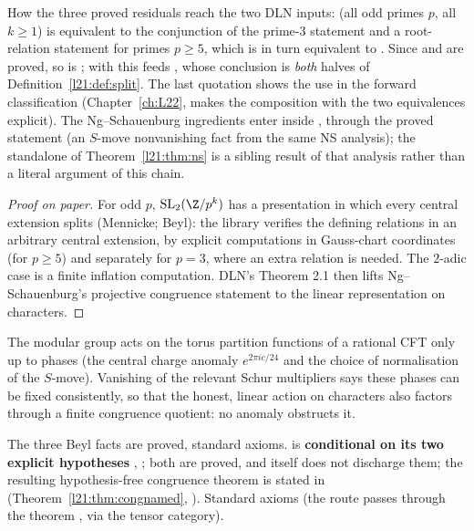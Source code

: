 \begin{dictionary}
How the three proved residuals reach the two DLN inputs:  (all odd primes $p$, all $k\ge1$) is
equivalent to the conjunction of the prime-$3$ statement  and a root-relation statement for primes
$p\ge5$, which is in turn equivalent to . Since  and
 are proved, so is ; with
 this feeds , whose conclusion is \emph{both} halves of
Definition~\ref{l21:def:split}. The last quotation shows the use in the forward classification (Chapter~\ref{ch:L22},
 makes the composition with the two equivalences explicit). The Ng--Schauenburg
ingredients enter inside , through the proved statement 
(an $S$-move nonvanishing fact from the same NS analysis); the standalone  of
Theorem~\ref{l21:thm:ns} is a sibling result of that analysis rather than a literal argument of this chain.
\end{dictionary}

\begin{proof}[Proof on paper]
For odd $p$, $\ltwooneSL(\Z/p^k)$ has a presentation in which every central extension splits (Mennicke; Beyl): the library
verifies the defining relations in an arbitrary central extension, by explicit computations in Gauss-chart coordinates
(for $p\ge5$) and separately for $p=3$, where an extra relation is needed. The $2$-adic case is a finite inflation computation.
DLN's Theorem 2.1 then lifts Ng--Schauenburg's projective congruence statement to the linear representation on characters.
\end{proof}

\begin{physics}
The modular group acts on the torus partition functions of a rational CFT only up to phases (the central charge
anomaly $e^{2\pi ic/24}$ and the choice of normalisation of the $S$-move). Vanishing of the relevant Schur multipliers
says these phases can be fixed consistently, so that the honest, linear action on characters also factors through
a finite congruence quotient: no anomaly obstructs it.
\end{physics}

\begin{status}
The three Beyl facts are proved, standard axioms.  is \textbf{conditional on its two explicit
hypotheses} , ; both are proved, and  itself does not discharge them; the
resulting hypothesis-free congruence theorem is stated in 
(Theorem~\ref{l21:thm:congnamed}, ).
Standard axioms (the route passes through the theorem , via the tensor category).
\end{status}

